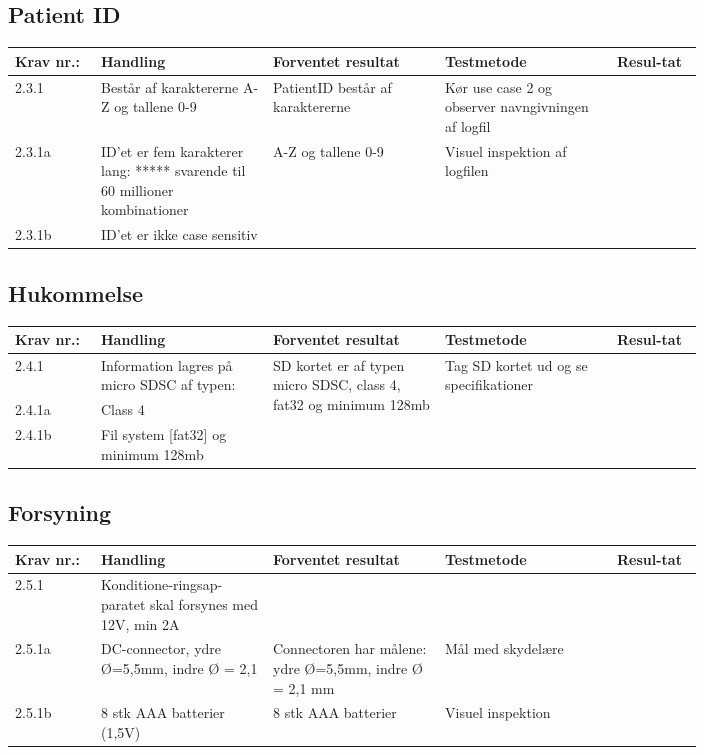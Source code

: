 			\pagebreak
			\subsection{Patient ID}
				\begin{longtable}{|p{0.1\linewidth}|p{0.2\linewidth}|p{0.2\linewidth}|p{0.2\linewidth}|p{0.1\linewidth}|}
					\hline
					Krav nr.: & Handling & Forventet resultat & Testmetode & Resul-tat  \\\hline
					2.3.1 & Består af karaktererne A-Z og tallene 0-9 & PatientID består af karaktererne  & Kør use case 2  og observer navngivningen af logfil & \\ \hline
					2.3.1a& ID’et er fem karakterer lang: ***** svarende til 60 millioner kombinationer & \multirow{2}{0.2\linewidth}{A-Z og tallene 0-9} & \multirow{2}{0.2\linewidth}{Visuel inspektion af logfilen}  & \multirow{2}{0.2\linewidth}{} \\ \cline{1-2}
					2.3.1b& ID’et er ikke case sensitiv  & &  & \\ \hline
				\end{longtable}
			
			\subsection{Hukommelse}
				\begin{longtable}{|p{0.1\linewidth}|p{0.2\linewidth}|p{0.2\linewidth}|p{0.2\linewidth}|p{0.1\linewidth}|}
					\hline
					Krav nr.: & Handling & Forventet resultat & Testmetode & Resul-tat  \\\hline
					2.4.1& Information lagres på micro SDSC af typen: & \multirow{3}{\linewidth}{SD kortet er af typen micro SDSC, class 4, fat32 og minimum 128mb} & \multirow{3}{\linewidth}{Tag SD kortet ud og se specifikationer}  & \multirow{3}{\linewidth}{}  \\ \cline{1-2}
					2.4.1a& Class 4 & &  & \\ \cline{1-2}
					2.4.1b& Fil system [fat32] og minimum 128mb  & &  & \\ \hline
				\end{longtable}
			
			\pagebreak
			\subsection{Forsyning}
				\begin{longtable}{|p{0.1\linewidth}|p{0.2\linewidth}|p{0.2\linewidth}|p{0.2\linewidth}|p{0.1\linewidth}|}
					\hline
					Krav nr.: & Handling & Forventet resultat & Testmetode & Resul-tat  \\\hline
					2.5.1& Konditione-ringsap-paratet skal forsynes med 12V, min 2A & &  & \\ \hline
					2.5.1a& DC-connector, ydre Ø=5,5mm, indre Ø = 2,1  & Connectoren har målene: ydre Ø=5,5mm, indre Ø = 2,1 mm & Mål med skydelære  & \\ \hline
					2.5.1b& 8 stk AAA batterier (1,5V)  & 8 stk AAA batterier & Visuel inspektion  & \\ \hline
				\end{longtable}
			
